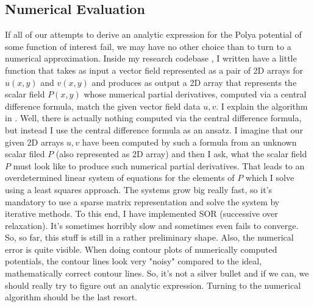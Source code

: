 \documentclass[12pt]{article}
\begin{document}



\subsection{Numerical Evaluation}
If all of our attempts to derive an analytic expression for the Polya potential of some function of interest fail, we may have no other choice than to turn to a numerical approximation. Inside my research codebase \cite{GitHub}, I written have a little function that takes as input a vector field represented as a pair of 2D arrays for $u(x,y)$ and $v(x,y)$ and produces as output a 2D array that represents the scalar field $P(x,y)$ whose numerical partial derivatives, computed via a central difference formula, match the given vector field data $u,v$. I explain the algorithm in \cite{PotentialNumerical}. Well, there is actually nothing computed via the central difference formula, but instead I use the central difference formula as an ansatz. I imagine that our given 2D arrays  $u,v$ have been computed by such a formula from an unknown scalar filed $P$ (also represented as 2D array) and then I ask, what the scalar field $P$ must look like to produce such numerical partial derivatives. That leads to an overdetermined linear system of equations for the elements of $P$ which I solve using a least squares approach. The systems grow big really fast, so it's mandatory to use a sparse matrix representation and solve the system by iterative methods. To this end, I have implemented SOR (successive over relaxation). It's sometimes horribly slow and sometimes even fails to converge. So, so far, this stuff is still in a rather preliminary shape. Also, the numerical error is quite visible. When doing contour plots of numerically computed potentials, the contour lines look very "noisy" compared to the ideal, mathematically correct contour lines. So, it's not a silver bullet and if we can, we should really try to figure out an analytic expression. Turning to the numerical algorithm should be the last resort.
\end{document}
